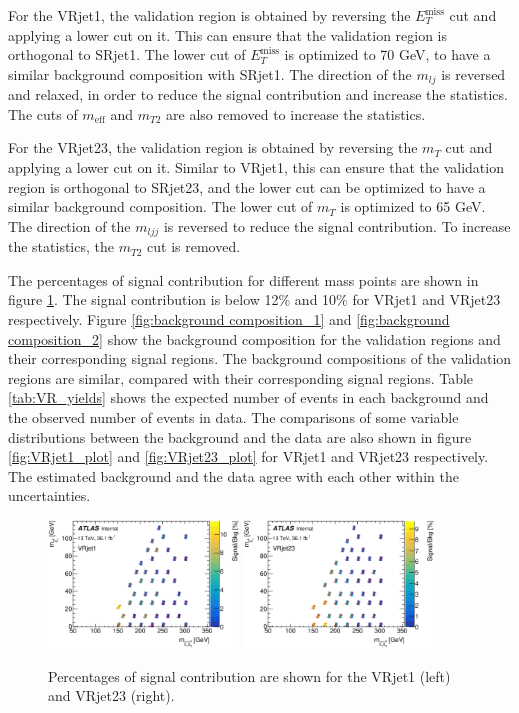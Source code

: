 For the VRjet1, the validation region is obtained by reversing the $E_T^{\text{miss}}$ cut and applying a lower cut on it.
This can ensure that the validation region is orthogonal to SRjet1.
The lower cut of $E_T^{\text{miss}}$ is optimized to 70 GeV, to have a similar background composition with SRjet1.
The direction of the $m_{lj}$ is reversed and relaxed, in order to reduce the signal contribution and increase the statistics.
The cuts of $m_{\text{eff}}$ and $m_{T2}$ are also removed to increase the statistics.

For the VRjet23, the validation region is obtained by reversing the $m_T$ cut and applying a lower cut on it.
Similar to VRjet1, this can ensure that the validation region is orthogonal to SRjet23, and the lower cut can be optimized to have a similar background composition.
The lower cut of $m_T$ is optimized to 65 GeV.
The direction of the $m_{ljj}$ is reversed to reduce the signal contribution.
To increase the statistics, the $m_{T2}$ cut is removed.

The percentages of signal contribution for different mass points are shown in figure \ref{fig:signal_contribution_VR}. The signal contribution is below 12\% and 10\% for VRjet1 and VRjet23 respectively.
Figure \ref{fig:background composition_1} and \ref{fig:background composition_2} show the background composition for the validation regions and their corresponding signal regions.
The background compositions of the validation regions are similar, compared with their corresponding signal regions.
Table \ref{tab:VR_yields} shows the expected number of events in each background and the observed number of events in data.
The comparisons of some variable distributions between the background and the data are also shown in figure \ref{fig:VRjet1_plot} and \ref{fig:VRjet23_plot} for VRjet1 and VRjet23 respectively.
The estimated background and the data agree with each other within the uncertainties.

\begin{figure}[htbp]
\centering
\includegraphics[width=0.45\textwidth]{data/plot/VR/SignalContamination_VRjet1.eps}
\includegraphics[width=0.45\textwidth]{data/plot/VR/SignalContamination_VRjet23.eps}
\caption{Percentages of signal contribution are shown for the VRjet1 (left) and VRjet23 (right).}
\label{fig:signal_contribution_VR}
\end{figure}

